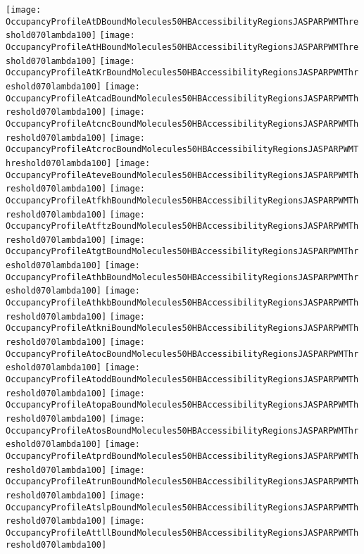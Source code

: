 \documentclass[11pt]{article}
\begin{document}
 


\begin{center}
\texttt{[image: OccupancyProfileAtDBoundMolecules50HBAccessibilityRegionsJASPARPWMThreshold070lambda100]}
\texttt{[image: OccupancyProfileAtHBoundMolecules50HBAccessibilityRegionsJASPARPWMThreshold070lambda100]}
\texttt{[image: OccupancyProfileAtKrBoundMolecules50HBAccessibilityRegionsJASPARPWMThreshold070lambda100]}
\texttt{[image: OccupancyProfileAtcadBoundMolecules50HBAccessibilityRegionsJASPARPWMThreshold070lambda100]}
\texttt{[image: OccupancyProfileAtcncBoundMolecules50HBAccessibilityRegionsJASPARPWMThreshold070lambda100]}
\texttt{[image: OccupancyProfileAtcrocBoundMolecules50HBAccessibilityRegionsJASPARPWMThreshold070lambda100]}
\texttt{[image: OccupancyProfileAteveBoundMolecules50HBAccessibilityRegionsJASPARPWMThreshold070lambda100]}
\texttt{[image: OccupancyProfileAtfkhBoundMolecules50HBAccessibilityRegionsJASPARPWMThreshold070lambda100]}
\texttt{[image: OccupancyProfileAtftzBoundMolecules50HBAccessibilityRegionsJASPARPWMThreshold070lambda100]}
\texttt{[image: OccupancyProfileAtgtBoundMolecules50HBAccessibilityRegionsJASPARPWMThreshold070lambda100]}
\texttt{[image: OccupancyProfileAthbBoundMolecules50HBAccessibilityRegionsJASPARPWMThreshold070lambda100]}
\texttt{[image: OccupancyProfileAthkbBoundMolecules50HBAccessibilityRegionsJASPARPWMThreshold070lambda100]}
\texttt{[image: OccupancyProfileAtkniBoundMolecules50HBAccessibilityRegionsJASPARPWMThreshold070lambda100]}
\texttt{[image: OccupancyProfileAtocBoundMolecules50HBAccessibilityRegionsJASPARPWMThreshold070lambda100]}
\texttt{[image: OccupancyProfileAtoddBoundMolecules50HBAccessibilityRegionsJASPARPWMThreshold070lambda100]}
\texttt{[image: OccupancyProfileAtopaBoundMolecules50HBAccessibilityRegionsJASPARPWMThreshold070lambda100]}
\texttt{[image: OccupancyProfileAtosBoundMolecules50HBAccessibilityRegionsJASPARPWMThreshold070lambda100]}
\texttt{[image: OccupancyProfileAtprdBoundMolecules50HBAccessibilityRegionsJASPARPWMThreshold070lambda100]}
\texttt{[image: OccupancyProfileAtrunBoundMolecules50HBAccessibilityRegionsJASPARPWMThreshold070lambda100]}
\texttt{[image: OccupancyProfileAtslpBoundMolecules50HBAccessibilityRegionsJASPARPWMThreshold070lambda100]}
\texttt{[image: OccupancyProfileAttllBoundMolecules50HBAccessibilityRegionsJASPARPWMThreshold070lambda100]}
\end{center}


\end{document}
